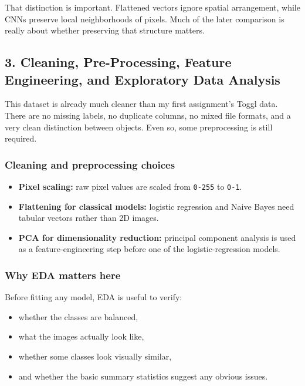 \documentclass[11pt]{article}
\providecommand{\tightlist}{%
      \setlength{\itemsep}{0pt}\setlength{\parskip}{0pt}}
\begin{document}
That distinction is important. Flattened vectors ignore spatial
arrangement, while CNNs preserve local neighborhoods of pixels. Much of
the later comparison is really about whether preserving that structure
matters.

    \subsection{3. Cleaning, Pre-Processing, Feature Engineering, and
Exploratory Data
Analysis}\label{cleaning-pre-processing-feature-engineering-and-exploratory-data-analysis}

This dataset is already much cleaner than my first assignment's Toggl
data. There are no missing labels, no duplicate columns, no mixed file
formats, and a very clean distinction between objects. Even so, some
preprocessing is still required.

\subsubsection{Cleaning and preprocessing
choices}\label{cleaning-and-preprocessing-choices}

\begin{itemize}
\tightlist
\item
  \textbf{Pixel scaling:} raw pixel values are scaled from
  \texttt{0-255} to \texttt{0-1}.
\item
  \textbf{Flattening for classical models:} logistic regression and
  Naive Bayes need tabular vectors rather than 2D images.
\item
  \textbf{PCA for dimensionality reduction:} principal component
  analysis is used as a feature-engineering step before one of the
  logistic-regression models.
\end{itemize}

\subsubsection{Why EDA matters here}\label{why-eda-matters-here}

Before fitting any model, EDA is useful to verify:

\begin{itemize}
\tightlist
\item
  whether the classes are balanced,
\item
  what the images actually look like,
\item
  whether some classes look visually similar,
\item
  and whether the basic summary statistics suggest any obvious issues.
\end{itemize}
\end{document}
